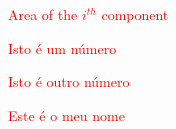 \begin{siglas}
\item[\textcolor{red}{Fig.}] \textcolor{red}{Area of the $i^{th}$ component}
\item[\textcolor{red}{456}] \textcolor{red}{Isto é um número}
\item[\textcolor{red}{123}] \textcolor{red}{Isto é outro número}
\item[\textcolor{red}{Fulano de Tal}] \textcolor{red}{Este é o meu nome}
\end{siglas}